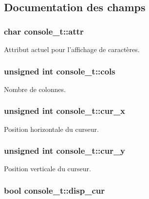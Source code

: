 \subsection{Documentation des champs}
\hypertarget{structconsole__t_a07b1c84ea67ce030ebd868917e56b0d9}{
\subsubsection[{attr}]{\setlength{\rightskip}{0pt plus 5cm}char console\+\_\+t\+::attr}}\label{structconsole__t_a07b1c84ea67ce030ebd868917e56b0d9}
Attribut actuel pour l'affichage de caractères. \hypertarget{structconsole__t_a338612e1f99838e2b34cdb289bc514b8}{
\subsubsection[{cols}]{\setlength{\rightskip}{0pt plus 5cm}unsigned int console\+\_\+t\+::cols}}\label{structconsole__t_a338612e1f99838e2b34cdb289bc514b8}
Nombre de colonnes. \hypertarget{structconsole__t_a296a99289941514aee3b5751d8cd0693}{
\subsubsection[{cur\+\_\+x}]{\setlength{\rightskip}{0pt plus 5cm}unsigned int console\+\_\+t\+::cur\+\_\+x}}\label{structconsole__t_a296a99289941514aee3b5751d8cd0693}
Position horizontale du curseur. \hypertarget{structconsole__t_a3192dab00ef66635ae4897943c47d6ec}{
\subsubsection[{cur\+\_\+y}]{\setlength{\rightskip}{0pt plus 5cm}unsigned int console\+\_\+t\+::cur\+\_\+y}}\label{structconsole__t_a3192dab00ef66635ae4897943c47d6ec}
Position verticale du curseur. \hypertarget{structconsole__t_a6242c03c5b347ed6b0909c1486116bee}{
\subsubsection[{disp\+\_\+cur}]{\setlength{\rightskip}{0pt plus 5cm}bool console\+\_\+t\+::disp\+\_\+cur}}\label{structconsole__t_a6242c03c5b347ed6b0909c1486116bee}
